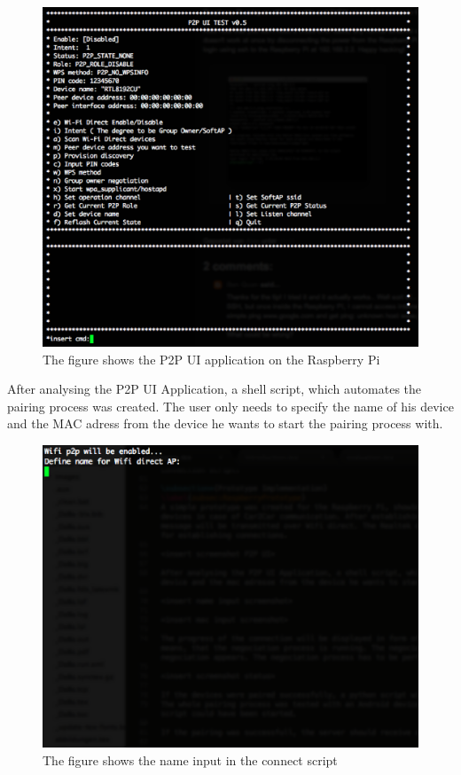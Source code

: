 \begin{figure}[!hb]
	\centering
  \includegraphics[width=\linewidth]{images/p2p_UI_screenshot.eps}
	\caption{The figure shows the P2P UI application on the Raspberry Pi}
	\label{fig1}
\end{figure}

\noindent After analysing the P2P UI Application, a shell script, which automates the pairing process was created. The user only needs to specify the name of his device and the MAC adress from the device he wants to start the pairing process with. 

\begin{figure}[!hb]
	\centering
  \includegraphics[width=\linewidth]{images/enterName_screenshot.eps}
	\caption{The figure shows the name input in the connect script}
	\label{fig1}
\end{figure}

